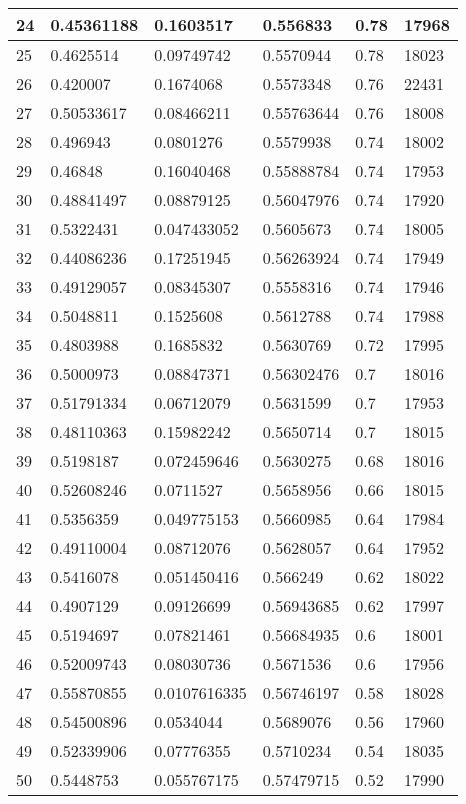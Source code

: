 \begin{longtable}{|l|l|l|l|l|l|}
24 & 0.45361188 & 0.1603517 & 0.556833 & 0.78 & 17968 \\ \hline 
25 & 0.4625514 & 0.09749742 & 0.5570944 & 0.78 & 18023 \\ \hline 
26 & 0.420007 & 0.1674068 & 0.5573348 & 0.76 & 22431 \\ \hline 
27 & 0.50533617 & 0.08466211 & 0.55763644 & 0.76 & 18008 \\ \hline 
28 & 0.496943 & 0.0801276 & 0.5579938 & 0.74 & 18002 \\ \hline 
29 & 0.46848 & 0.16040468 & 0.55888784 & 0.74 & 17953 \\ \hline 
30 & 0.48841497 & 0.08879125 & 0.56047976 & 0.74 & 17920 \\ \hline 
31 & 0.5322431 & 0.047433052 & 0.5605673 & 0.74 & 18005 \\ \hline 
32 & 0.44086236 & 0.17251945 & 0.56263924 & 0.74 & 17949 \\ \hline 
33 & 0.49129057 & 0.08345307 & 0.5558316 & 0.74 & 17946 \\ \hline 
34 & 0.5048811 & 0.1525608 & 0.5612788 & 0.74 & 17988 \\ \hline 
35 & 0.4803988 & 0.1685832 & 0.5630769 & 0.72 & 17995 \\ \hline 
36 & 0.5000973 & 0.08847371 & 0.56302476 & 0.7 & 18016 \\ \hline 
37 & 0.51791334 & 0.06712079 & 0.5631599 & 0.7 & 17953 \\ \hline 
38 & 0.48110363 & 0.15982242 & 0.5650714 & 0.7 & 18015 \\ \hline 
39 & 0.5198187 & 0.072459646 & 0.5630275 & 0.68 & 18016 \\ \hline 
40 & 0.52608246 & 0.0711527 & 0.5658956 & 0.66 & 18015 \\ \hline 
41 & 0.5356359 & 0.049775153 & 0.5660985 & 0.64 & 17984 \\ \hline 
42 & 0.49110004 & 0.08712076 & 0.5628057 & 0.64 & 17952 \\ \hline 
43 & 0.5416078 & 0.051450416 & 0.566249 & 0.62 & 18022 \\ \hline 
44 & 0.4907129 & 0.09126699 & 0.56943685 & 0.62 & 17997 \\ \hline 
45 & 0.5194697 & 0.07821461 & 0.56684935 & 0.6 & 18001 \\ \hline 
46 & 0.52009743 & 0.08030736 & 0.5671536 & 0.6 & 17956 \\ \hline 
47 & 0.55870855 & 0.0107616335 & 0.56746197 & 0.58 & 18028 \\ \hline 
48 & 0.54500896 & 0.0534044 & 0.5689076 & 0.56 & 17960 \\ \hline 
49 & 0.52339906 & 0.07776355 & 0.5710234 & 0.54 & 18035 \\ \hline 
50 & 0.5448753 & 0.055767175 & 0.57479715 & 0.52 & 17990 \\ \hline 
\end{longtable}